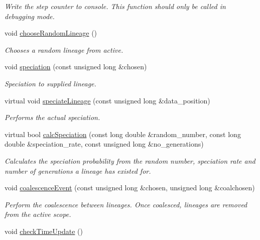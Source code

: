 \begin{DoxyCompactItemize}
\begin{DoxyCompactList}\small\item\em Write the step counter to console. This function should only be called in debugging mode. \end{DoxyCompactList}\item 
void \hyperlink{class_tree_a23803bddf46ad28a1bdd46bf05693b1f}{choose\+Random\+Lineage} ()
\begin{DoxyCompactList}\small\item\em Chooses a random lineage from active. \end{DoxyCompactList}\item 
void \hyperlink{class_tree_a05c9e44f1a4d7af83e65b6c4565b1b28}{speciation} (const unsigned long \&chosen)
\begin{DoxyCompactList}\small\item\em Speciation to supplied lineage. \end{DoxyCompactList}\item 
virtual void \hyperlink{class_tree_a32e12cc62ce2d9ae893214b1f4cfad1f}{speciate\+Lineage} (const unsigned long \&data\+\_\+position)
\begin{DoxyCompactList}\small\item\em Performs the actual speciation. \end{DoxyCompactList}\item 
virtual bool \hyperlink{class_tree_abc9389511e1aecf5e573315fc8f4d77c}{calc\+Speciation} (const long double \&random\+\_\+number, const long double \&speciation\+\_\+rate, const unsigned long \&no\+\_\+generations)
\begin{DoxyCompactList}\small\item\em Calculates the speciation probability from the random number, speciation rate and number of generations a lineage has existed for. \end{DoxyCompactList}\item 
void \hyperlink{class_tree_a16eedb70009e7570d933f88e8ce44117}{coalescence\+Event} (const unsigned long \&chosen, unsigned long \&coalchosen)
\begin{DoxyCompactList}\small\item\em Perform the coalescence between lineages. Once coalesced, lineages are removed from the active scope. \end{DoxyCompactList}\item 
void \hyperlink{class_tree_afcbe72c55b38c94ae17de9c2e1dd3a7f}{check\+Time\+Update} ()\hypertarget{class_tree_afcbe72c55b38c94ae17de9c2e1dd3a7f}{}\label{class_tree_afcbe72c55b38c94ae17de9c2e1dd3a7f}


\end{DoxyCompactItemize}
